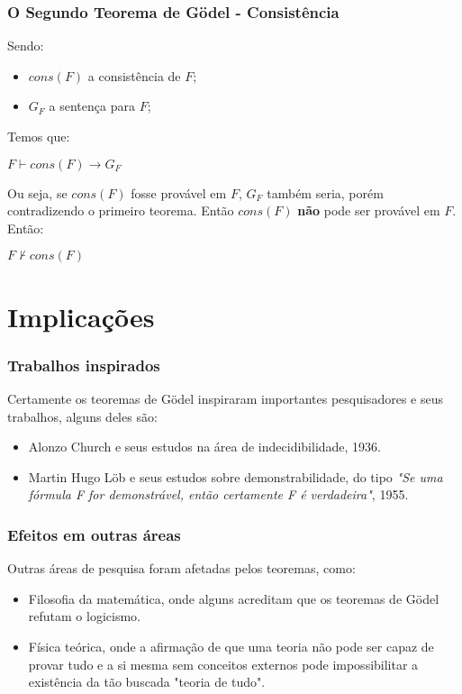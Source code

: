 \documentclass{beamer}
\begin{document}
\begin{frame}
    \frametitle{O Segundo Teorema de Gödel - Consistência}

    Sendo:
    \begin{center}
        \begin{itemize}
            \item $cons(F)$ a consistência de $F$;
            \item $G_F$ a sentença para $F$;
        \end{itemize}
    \end{center}
    
    Temos que:
    \begin{center}
        $F \vdash cons(F) \rightarrow G_F$ \\
    \end{center} 
    Ou seja, se $cons(F)$ fosse provável em $F$, $G_F$ também seria, porém contradizendo o primeiro teorema. Então $cons(F)$ \textbf{não} pode ser provável em $F$.\\
    
    Então:
    \begin{center}
        $F \nvdash cons(F)$
    \end{center}
\end{frame}

%
%

\section{Implicações}
\begin{frame}
    \frametitle{Trabalhos inspirados}

    Certamente os teoremas de Gödel inspiraram importantes pesquisadores e seus trabalhos, alguns deles são:
    \begin{itemize}
        \item Alonzo Church e seus estudos na área de indecidibilidade, 1936.
        \item Martin Hugo Löb e seus estudos sobre demonstrabilidade, do tipo \textit{"Se uma fórmula F for demonstrável, então certamente F é verdadeira"}, 1955.
    \end{itemize}
\end{frame}

\begin{frame}
    \frametitle{Efeitos em outras áreas}

    Outras áreas de pesquisa foram afetadas pelos teoremas, como:
    \begin{itemize}
        \item Filosofia da matemática, onde alguns acreditam que os teoremas de Gödel refutam o logicismo.
        \item Física teórica, onde a afirmação de que uma teoria não pode ser capaz de provar tudo e a si mesma sem conceitos externos pode impossibilitar a existência da tão buscada "teoria de tudo". 
    \end{itemize}
\end{frame}
\end{document}
